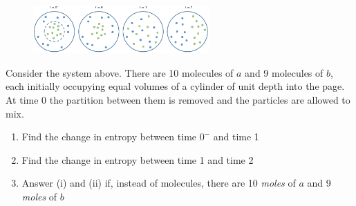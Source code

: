 \documentclass[12pt]{article}
\begin{document}
\begin{figure}[h]\centering\includegraphics[width=0.6\textwidth]{Graphics/entropy_spheres.PNG}\end{figure}
Consider the system above. There are 10 molecules of $a$ and 9 molecules of $b$, each initially occupying equal volumes of a cylinder of unit depth into the page. At time 0 the partition between them is removed and the particles are allowed to mix.
\begin{enumerate}[label=(\roman*)]
\item Find the change in entropy between time $0^-$ and time 1
\item Find the change in entropy between time 1 and time 2
\item Answer (i) and (ii) if, instead of molecules, there are 10 \emph{moles} of $a$ and 9 \emph{moles} of $b$
\end{enumerate}
\end{document}
